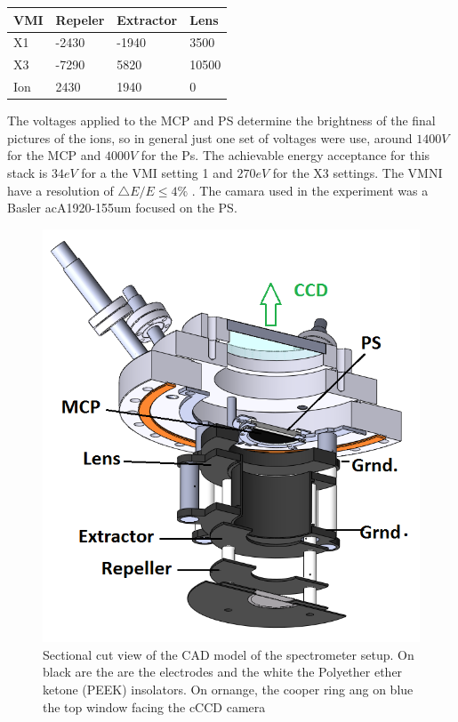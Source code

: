 \begin{table}[]
\centering
\begin{tabular}{|l|l|l|l|}
\hline
\rowcolor[HTML]{EFEFEF} 
VMI & Repeler & Extractor & Lens  \\ \hline
X1  & -2430   & -1940     & 3500  \\ \hline
X3  & -7290   & 5820      & 10500 \\ \hline
Ion & 2430    & 1940      & 0     \\ \hline
\end{tabular}
\end{table}

The voltages applied to the MCP and PS determine the brightness of the final pictures of the ions, so in general just one set of voltages were use, around $1400V$ for the MCP and $4000V$ for the Ps. The achievable energy acceptance for this stack is  $34eV$ for a the VMI setting 1 and $270 eV$ for the X3 settings. The VMNI have a resolution of $\bigtriangleup E / E\leq 4\%$ \cite{schomas_compact_2017}. The camara used in the experiment was a Basler  acA1920-155um focused on the PS.

\begin{figure}[hbtp]
\label{img:mcp cut}
\centering
\includegraphics[scale=1]{../Images/MCP cut.png}
\caption[MCP scketckht cut]{Sectional cut view of the CAD model of the spectrometer setup. On black are the are the electrodes and the white the Polyether ether ketone (PEEK) insolators. On ornange, the cooper ring ang on blue the top window facing the cCCD camera
}
\end{figure}

